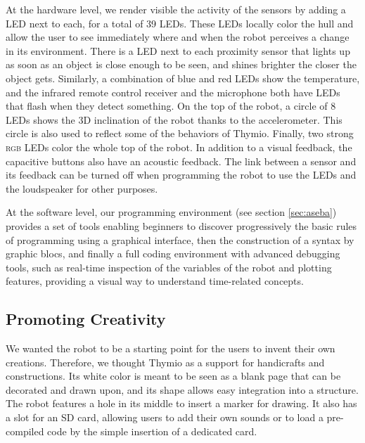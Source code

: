 \documentclass[letterpaper, 10 pt, conference]{ieeeconf}  %
\begin{document}
At the hardware level, we render visible the activity of the sensors by adding a LED next to each, for a total of 39 LEDs.
These LEDs locally color the hull and allow the user to see immediately where and when the robot perceives a change in its environment.
There is a LED next to each proximity sensor that lights up as soon as an object is close enough to be seen, and shines brighter the closer the object gets.
Similarly, a combination of blue and red LEDs show the temperature, and the infrared remote control receiver and the microphone both have LEDs that flash when they detect something.
On the top of the robot, a circle of 8 LEDs shows the 3D inclination of the robot thanks to the accelerometer. 
This circle is also used to reflect some of the behaviors of Thymio.
Finally, two strong \textsc{rgb} LEDs color the whole top of the robot.
In addition to a visual feedback, the capacitive buttons also have an acoustic feedback.
The link between a sensor and its feedback can be turned off when programming the robot to use the LEDs and the loudspeaker for other purposes.

At the software level, our programming environment (see section \ref{sec:aseba}) provides a set of tools enabling beginners to discover progressively the basic rules of programming using a graphical interface, then the construction of a syntax by graphic blocs, and finally a full coding environment with advanced debugging tools, such as real-time inspection of the variables of the robot and plotting features, providing a visual way to understand time-related concepts.

\subsection{Promoting Creativity}

We wanted the robot to be a starting point for the users to invent their own creations.
Therefore, we thought Thymio as a support for handicrafts and constructions.
Its white color is meant to be seen as a blank page that can be decorated and drawn upon, and its shape allows easy integration into a structure.
The robot features a hole in its middle to insert a marker for drawing.
It also has a slot for an SD card, allowing users to add their own sounds or to load a pre-compiled code by the simple insertion of a dedicated card.
\end{document}
